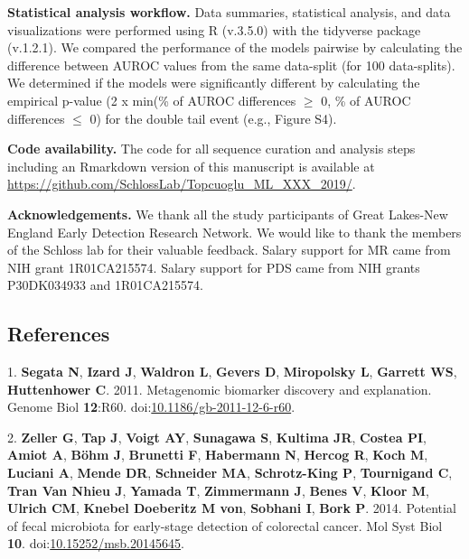 \documentclass[
  11pt,
]{article}
\begin{document}
\textbf{Statistical analysis workflow.} Data summaries, statistical
analysis, and data visualizations were performed using R (v.3.5.0) with
the tidyverse package (v.1.2.1). We compared the performance of the
models pairwise by calculating the difference between AUROC values from
the same data-split (for 100 data-splits). We determined if the models
were significantly different by calculating the empirical p-value (2 x
min(\% of AUROC differences \(\geq\) 0, \% of AUROC differences \(\leq\)
0) for the double tail event (e.g., Figure S4).

\textbf{Code availability.} The code for all sequence curation and
analysis steps including an Rmarkdown version of this manuscript is
available at \url{https://github.com/SchlossLab/Topcuoglu_ML_XXX_2019/}.

\textbf{Acknowledgements.} We thank all the study participants of Great
Lakes-New England Early Detection Research Network. We would like to
thank the members of the Schloss lab for their valuable feedback. Salary
support for MR came from NIH grant 1R01CA215574. Salary support for PDS
came from NIH grants P30DK034933 and 1R01CA215574.

\newpage

\hypertarget{references}{%
\subsection{References}\label{references}}

\hypertarget{refs}{}
\leavevmode\hypertarget{ref-segata_metagenomic_2011}{}%
1. \textbf{Segata N}, \textbf{Izard J}, \textbf{Waldron L},
\textbf{Gevers D}, \textbf{Miropolsky L}, \textbf{Garrett WS},
\textbf{Huttenhower C}. 2011. Metagenomic biomarker discovery and
explanation. Genome Biol \textbf{12}:R60.
doi:\href{https://doi.org/10.1186/gb-2011-12-6-r60}{10.1186/gb-2011-12-6-r60}.

\leavevmode\hypertarget{ref-zeller_potential_2014}{}%
2. \textbf{Zeller G}, \textbf{Tap J}, \textbf{Voigt AY},
\textbf{Sunagawa S}, \textbf{Kultima JR}, \textbf{Costea PI},
\textbf{Amiot A}, \textbf{Böhm J}, \textbf{Brunetti F},
\textbf{Habermann N}, \textbf{Hercog R}, \textbf{Koch M},
\textbf{Luciani A}, \textbf{Mende DR}, \textbf{Schneider MA},
\textbf{Schrotz-King P}, \textbf{Tournigand C}, \textbf{Tran Van Nhieu
J}, \textbf{Yamada T}, \textbf{Zimmermann J}, \textbf{Benes V},
\textbf{Kloor M}, \textbf{Ulrich CM}, \textbf{Knebel Doeberitz M von},
\textbf{Sobhani I}, \textbf{Bork P}. 2014. Potential of fecal microbiota
for early-stage detection of colorectal cancer. Mol Syst Biol
\textbf{10}.
doi:\href{https://doi.org/10.15252/msb.20145645}{10.15252/msb.20145645}.
\end{document}
